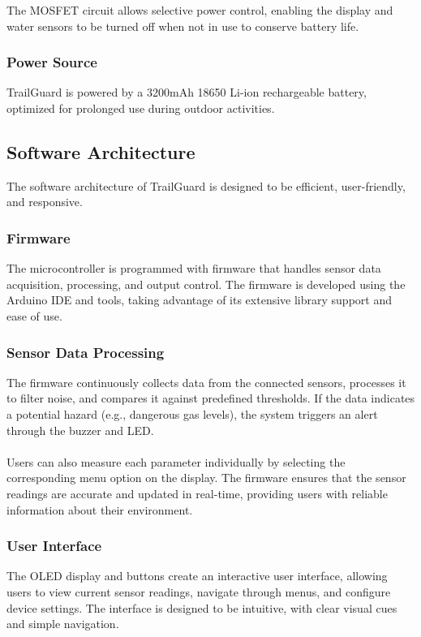 \documentclass[a4paper,11pt]{article}%
\begin{document}
The MOSFET circuit allows selective power control, enabling the display and water sensors to be turned off when not in use to conserve battery life.
\subsubsection{Power Source} 
TrailGuard is powered by a 3200mAh 18650 Li-ion rechargeable battery, optimized for prolonged use during outdoor activities.

\subsection{Software Architecture}
The software architecture of TrailGuard is designed to be efficient, user-friendly, and responsive. 

\subsubsection{Firmware}
The microcontroller is programmed with firmware that handles sensor data acquisition, processing, and output control. The firmware is developed using the Arduino IDE and tools, taking advantage of its extensive library support and ease of use.

\subsubsection{Sensor Data Processing}
 The firmware continuously collects data from the connected sensors, processes it to filter noise, and compares it against predefined thresholds. If the data indicates a potential hazard (e.g., dangerous gas levels), the system triggers an alert through the buzzer and LED.
\\
\\
 Users can also measure each parameter individually by selecting the corresponding menu option on the display. The firmware ensures that the sensor readings are accurate and updated in real-time, providing users with reliable information about their environment.
 \subsubsection{User Interface}
 The OLED display and buttons create an interactive user interface, allowing users to view current sensor readings, navigate through menus, and configure device settings. The interface is designed to be intuitive, with clear visual cues and simple navigation.
\end{document}
